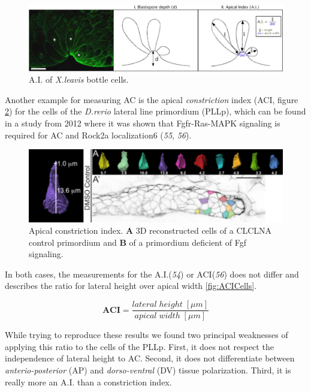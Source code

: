 \documentclass[11pt,singlespacinge,twoside]{reedthesis} %
\begin{document}
\begin{figure}

{\centering \includegraphics[width=0.75\linewidth]{figure/02-MaMo/ACI/Jen_yi_Lee} 

}

\caption{A.I. of \emph{X.leavis} bottle cells.}\label{fig:ACLee}
\end{figure}
\noindent Another example for measuring AC is the apical \emph{constriction} index (ACI, figure \ref{fig:ACHard}) for the cells of the \emph{D.rerio} lateral line primordium (PLLp), which can be found in a study from 2012 where it was shown that Fgfr-Ras-MAPK signaling is required for AC and Rock2a localization6 (\emph{55}, \emph{56}).


\begin{figure}

{\centering \includegraphics[width=0.75\linewidth]{figure/02-MaMo/ACI/Harding} 

}

\caption[Apical constriction index]{Apical constriction index. \textbf{A} 3D reconstructed cells of a CLCLNA control primordium and \textbf{B} of a primordium deficient of Fgf signaling.}\label{fig:ACHard}
\end{figure}
\noindent In both cases, the measurements for the A.I.(\emph{54}) or ACI(\emph{56}) does not differ and describes the ratio for lateral height over apical width \ref{fig:ACICells}.

\[\mathbf{ACI} = \frac{lateral\;height\;[\mu m]}{apical\;width\;[\mu m]}\]

\noindent While trying to reproduce these results we found two principal weaknesses of applying this ratio to the cells of the PLLp. First, it does not respect the independence of lateral height to AC. Second, it does not differentiate between \emph{anterio-posterior} (AP) and \emph{dorso-ventral} (DV) tissue polarization. Third, it is really more an A.I. than a constriction index.
\end{document}
